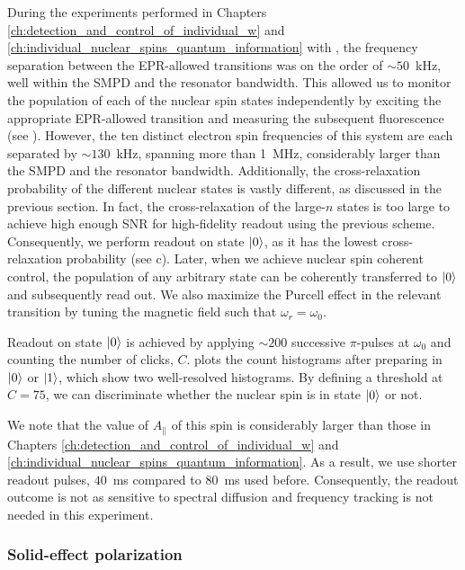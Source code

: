 During the experiments performed in Chapters \ref{ch:detection_and_control_of_individual_w} and \ref{ch:individual_nuclear_spins_quantum_information} with \W, the frequency separation between the EPR-allowed transitions was on the order of $\sim50$~kHz, well within the SMPD and the resonator bandwidth. This allowed us to monitor the population of each of the nuclear spin states independently by exciting the appropriate EPR-allowed transition and measuring the subsequent fluorescence (see ). However, the ten distinct electron spin frequencies of this system are each separated by $\sim130$~kHz, spanning more than 1~MHz, considerably larger than the SMPD and the resonator bandwidth. Additionally, the cross-relaxation probability of the different nuclear states is vastly different, as discussed in the previous section. In fact, the cross-relaxation of the large-$n$ states is too large to achieve high enough SNR for high-fidelity readout using the previous scheme. Consequently, we perform readout on state $\ket{0}$, as it has the lowest cross-relaxation probability (see c). Later, when we achieve nuclear spin coherent control, the population of any arbitrary state can be coherently transferred to $\ket{0}$ and subsequently read out. We also maximize the Purcell effect in the relevant transition by tuning the magnetic field such that $\omega_r = \omega_0$.

Readout on state $\ket{0}$ is achieved by applying $\sim 200$ successive $\pi$-pulses at $\omega_0$ and counting the number of clicks, $C$.  plots the count histograms after preparing in $\ket{0}$ or $\ket{1}$, which show two well-resolved histograms. By defining a threshold at $C=75$, we can discriminate whether the nuclear spin is in state $\ket{0}$ or not.

We note that the value of $A_\parallel$ of this spin is considerably larger than those in Chapters \ref{ch:detection_and_control_of_individual_w} and \ref{ch:individual_nuclear_spins_quantum_information}. As a result, we use shorter readout pulses, $40$~ms compared to $80$~ms used before. Consequently, the readout outcome is not as sensitive to spectral diffusion and frequency tracking is not needed in this experiment.

\subsubsection{Solid-effect polarization}

